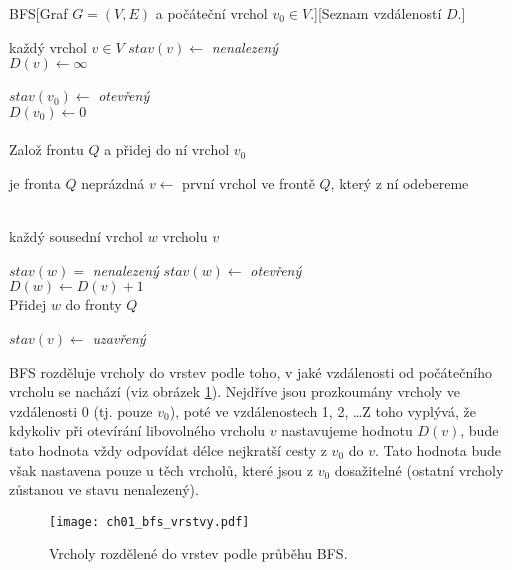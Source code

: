 \begin{pseudo}{BFS}[Graf $G=(V,E)$ a počáteční vrchol $v_0\in V$.][Seznam vzdáleností $D$.]
    \begin{For}{každý vrchol $v\in V$}
        $stav(v)\leftarrow$ \textit{nenalezený}\\
        $D(v)\leftarrow\infty$
    \end{For}
    $stav(v_0)\leftarrow$ \textit{otevřený}\\
    $D(v_0)\leftarrow 0$\\\\
    Založ frontu $Q$ a přidej do ní vrchol $v_0$\\
    \begin{While}{je fronta $Q$ neprázdná}
        $v\leftarrow$ první vrchol ve frontě $Q$, který z ní odebereme\\\\
        \begin{For}{každý sousední vrchol $w$ vrcholu $v$}
            \begin{If}{$stav(w)=$ \textit{nenalezený}}
                $stav(w)\leftarrow$ \textit{otevřený}\\
                $D(w)\leftarrow D(v)+1$\\
                Přidej $w$ do fronty $Q$
            \end{If}
        \end{For}
        $stav(v)\leftarrow$ \textit{uzavřený}
    \end{While}
\end{pseudo}

BFS rozděluje vrcholy do vrstev podle toho, v jaké vzdálenosti od počátečního vrcholu se nachází (viz obrázek \ref{fig:bfs_vrstvy}). Nejdříve jsou prozkoumány vrcholy ve vzdálenosti 0 (tj. pouze $v_0$), poté ve vzdálenostech 1, 2, \dots Z toho vyplývá, že kdykoliv při otevírání libovolného vrcholu $v$ nastavujeme hodnotu $D(v)$, bude tato hodnota vždy odpovídat délce nejkratší cesty z $v_0$ do $v$. Tato hodnota bude však nastavena pouze u těch vrcholů, které jsou z $v_0$ dosažitelné (ostatní vrcholy zůstanou ve stavu nenalezený).
\begin{figure}[h]
    \centering
    \texttt{[image: ch01\_bfs\_vrstvy.pdf]}
    \caption{Vrcholy rozdělené do vrstev podle průběhu BFS.}
    \label{fig:bfs_vrstvy}
\end{figure}

